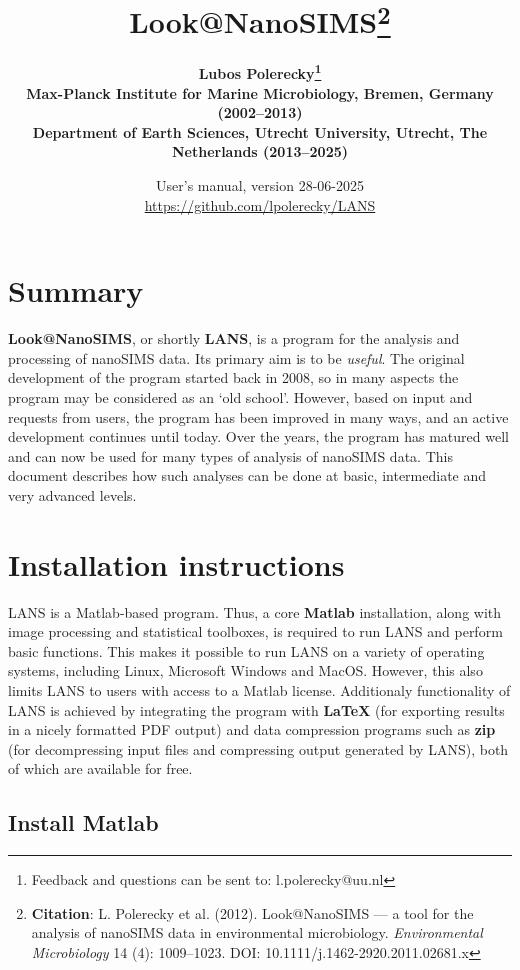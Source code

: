 \documentclass[a4paper, 11pt]{article}
\title{{\LARGE \bf Look@NanoSIMS}\footnote{\textbf{Citation}: L. Polerecky et al. (2012). Look@NanoSIMS --- a tool for the analysis of nanoSIMS data in environmental microbiology. \textit{Environmental Microbiology} 14 (4): 1009--1023. DOI: 10.1111/j.1462-2920.2011.02681.x}}
\author{\large\bf Lubos Polerecky\footnote{Feedback and questions can be sent to: l.polerecky@uu.nl}\\[3mm]
Max-Planck Institute for Marine Microbiology, Bremen, Germany (2002--2013)\\[2mm]
Department of Earth Sciences, Utrecht University, Utrecht, The Netherlands (2013--2025)}
\date{User's manual, version 28-06-2025\\[3mm]
\url{https://github.com/lpolerecky/LANS}}
\begin{document}
\maketitle
\reversemarginpar 


\section*{Summary}
\textbf{Look@NanoSIMS}, or shortly \textbf{LANS}, is a program for the analysis and processing of nanoSIMS data. Its primary aim is to be \emph{useful}.  The original development of the program started back in 2008, so in many aspects the program may be considered as an `old school'. However, based on input and requests from users, the program has been improved in many ways, and an active development continues until today. Over the years, the program has matured well and can now be used for many types of analysis of nanoSIMS data. This document describes how such analyses can be done at basic, intermediate and very advanced levels.


\tableofcontents

\section{Installation instructions}

LANS is a Matlab-based program. Thus, a core \textbf{Matlab} installation, along with image processing and statistical toolboxes, is required to run LANS and perform basic functions. This makes it possible to run LANS on a variety of operating systems, including Linux, Microsoft Windows and MacOS. However, this also limits LANS to users with access to a Matlab license. Additionaly functionality of LANS is achieved by integrating the program with \textbf{\LaTeX} (for exporting results in a nicely formatted PDF output) and data compression programs such as \textbf{zip} (for decompressing input files and compressing output generated by LANS), both of which are available for free.


\subsection{Install Matlab}
\end{document}
